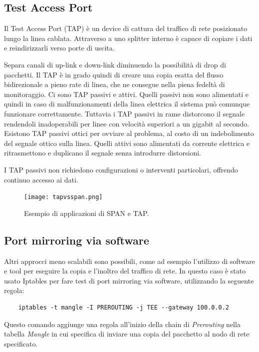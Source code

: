 \subsection{Test Access Port}
Il Test Access Port (TAP) è un device di cattura del traffico di rete posizionato lungo la linea cablata. Attraverso a uno splitter interno è capace di copiare i dati e reindirizzarli verso porte di uscita.

Separa canali di up-link e down-link diminuendo  la possibilità di drop di pacchetti.
Il TAP è in grado quindi di creare una copia esatta del flusso bidirezionale a pieno rate di linea, che ne consegue nella piena fedeltà di monitoraggio.
Ci sono TAP passivi e attivi.
Quelli passivi non sono alimentati  e quindi in caso di malfunzionamenti della linea elettrica il sistema può comunque funzionare correttamente. Tuttavia i TAP passivi in rame distorcono il segnale rendendoli inadoperabili per linee con velocità superiori a un gigabit al secondo. Esistono TAP passivi ottici per ovviare al problema, al costo di un indebolimento del segnale ottico sulla linea.
Quelli attivi sono alimentati da corrente elettrica e ritrasmettono e duplicano il segnale senza introdurre distorsioni.

I TAP passivi non richiedono configurazioni o interventi particolari, offrendo continuo accesso ai dati.

\begin{figure}[hbtp]
    \centering
    \texttt{[image: tapvsspan.png]}
    \caption{Esempio di applicazioni di SPAN e TAP.}
    \label{fig:tapvsspan}
\end{figure}

\subsection{Port mirroring via software}
Altri approcci meno scalabili sono possibili, come ad esempio l'utilizzo di software e tool per eseguire la copia e l'inoltro del traffico di rete.
In questo caso è stato usato Iptables per fare test di port mirroring via software, utilizzando la seguente regola:
\begin{verbatim}
    iptables -t mangle -I PREROUTING -j TEE --gateway 100.0.0.2 
\end{verbatim}
Questo comando aggiunge una regola all'inizio della chain di \textit{Prerouting} nella tabella \textit{Mangle} in cui specifica di inviare una copia del pacchetto al nodo di rete specificato.



